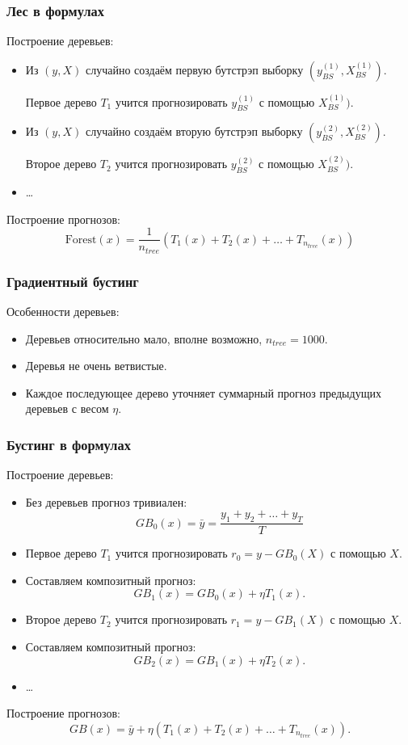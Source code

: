 \begin{frame}
  \frametitle{Лес в формулах}
  Построение \alert{деревьев}:
  \begin{itemize}[<+->]
    \item Из $(y, X)$ случайно создаём первую бутстрэп выборку $(y_{BS}^{(1)}, X_{BS}^{(1)})$.
    
    Первое дерево $T_1$ учится прогнозировать $y_{BS}^{(1)}$ с помощью $X_{BS}^{(1)})$.

    \item Из $(y, X)$ случайно создаём вторую бутстрэп выборку $(y_{BS}^{(2)}, X_{BS}^{(2)})$.
    
    Второе дерево $T_2$ учится прогнозировать $y_{BS}^{(2)}$ с помощью $X_{BS}^{(2)})$.

    \item \ldots

  \end{itemize}

  \pause
  Построение \alert{прогнозов}:
  \[
  \text{Forest}(x) = \frac{1}{n_{tree}}(T_1(x) + T_2(x) + \ldots + T_{n_{tree}} (x))
  \]
\end{frame}


  \begin{frame}
    \frametitle{Градиентный бустинг}

    Особенности деревьев:
    \begin{itemize}[<+->]
      \item Деревьев относительно \alert{мало}, вполне возможно, $n_{tree} = 1000$.
      \item Деревья не очень \alert{ветвистые}.
      \item Каждое последующее дерево \alert{уточняет} суммарный прогноз предыдущих деревьев
      с весом $\eta$.
    \end{itemize}
  \end{frame}


  \begin{frame}
    \frametitle{Бустинг в формулах}
    Построение \alert{деревьев}:
    \begin{itemize}[<+->]
      \item Без деревьев прогноз тривиален: 
      \[
        GB_0(x) = \bar y = \frac{y_1 + y_2 + \ldots + y_T}{T}
      \]
      \item Первое дерево $T_1$ учится прогнозировать $r_0 = y - GB_0(X)$ с помощью $X$.
      \item Составляем композитный прогноз:
      \[
      GB_1(x) = GB_0(x) + \eta T_1(x).  
      \]
  
      \item Второе дерево $T_2$ учится прогнозировать $r_1 = y - GB_1(X)$ с помощью  $X$.
      \item Составляем композитный прогноз:
      \[
      GB_2(x) = GB_1(x) + \eta T_2(x).  
      \]
      \item \ldots
  
    \end{itemize}
  
    \pause
    Построение \alert{прогнозов}:
    \[
    GB(x) = \bar y + \eta (T_1(x) + T_2(x) + \ldots + T_{n_{tree}}(x)).
    \]
  \end{frame}
  


